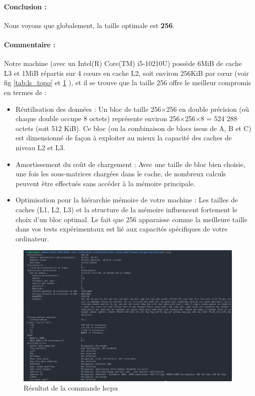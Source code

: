 \documentclass[a4paper,13pt]{book}
\begin{document}
\paragraph{Conclusion : }Nous voyons que globalement, la taille optimale est \textbf{256}.
\paragraph{Commentaire : }
Notre machine (avec un Intel(R) Core(TM) i5-10210U) possède 6MiB de cache L3 et 1MiB répartis sur 4 cœurs en cache L2, soit environ 256KiB par cœur (voir fig \ref{tab:ls_topo} et \ref{tab:lscpu} ), et il se trouve que la taille 256 offre le meilleur compromis en termes de :
\begin{itemize}
    \item Réutilisation des données : Un bloc de taille 256$\times$256 en double précision (où chaque double occupe 8 octets) représente environ 256$\times$256$\times$8 = 524 288 octets (soit 512 KiB). Ce bloc (ou la combinaison de blocs issus de A, B et C) est dimensionné de façon à exploiter au mieux la capacité des caches de niveau L2 et L3.
    \item Amortissement du coût de chargement : Avec une taille de bloc bien choisie, une fois les sous-matrices chargées dans le cache, de nombreux calculs peuvent être effectués sans accéder à la mémoire principale.
    \item Optimisation pour la hiérarchie mémoire de votre machine : Les tailles de caches (L1, L2, L3) et la structure de la mémoire influencent fortement le choix d’un bloc optimal. Le fait que 256 apparaisse comme la meilleure taille dans vos tests expérimentaux est lié aux capacités spécifiques de votre ordinateur.
\end{itemize}

\begin{figure}[!h]
    \begin{center}
    \includegraphics[scale=0.5]{images/lscpu.png}
    \caption{Résultat de la commande lscpu}
    \label{tab:lscpu}
\end{center}
\end{figure}
\end{document}
